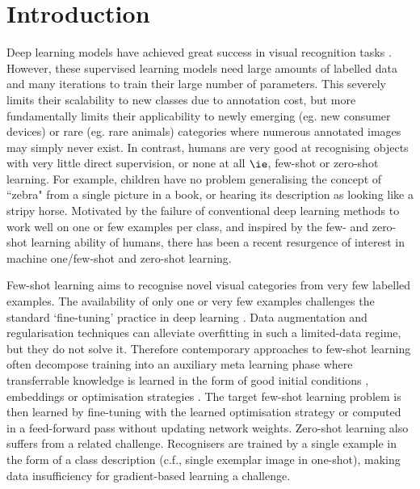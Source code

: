 \documentclass[10pt,twocolumn,letterpaper]{article}
\begin{document}
\section{Introduction}
Deep learning models have achieved great success in visual recognition tasks \cite{krizhevsky2012imagenet, he2016deep, simonyan2014very}. However, these supervised learning models need large amounts of labelled data and many iterations to train their large number of parameters. This severely limits their scalability to new classes due to annotation cost, but more fundamentally limits their applicability to newly emerging (eg. new consumer devices) or rare (eg. rare animals) categories where numerous annotated images may simply never exist. In contrast, humans are very good at recognising objects with very little direct supervision, or none at all $\ie$, few-shot  \cite{lake2011one, fei2006one} or zero-shot  \cite{lampert2014attribute} learning. For example, children have no problem generalising the concept of ``zebra" from a single picture in a book, or hearing its description as looking like a stripy horse. Motivated by the failure of conventional deep learning methods to work well on one or few examples per class, and inspired by the few- and zero-shot learning ability of humans, there has been a recent resurgence of interest in machine one/few-shot \cite{edwards2016towards, vinyals2016matching, santoro2016meta, kaiser2017learning, koch2015siamese, finn2017model, munkhdalai2017meta, snell2017prototypical, ravi2016optimization} and zero-shot \cite{frome2013devise,akata2015evaluation,lampert2014attribute,zhang2017learning,lei2015predicting,romera2015embarrassingly} learning.

Few-shot learning aims to recognise novel visual categories from very few labelled examples. The availability of only one or very few examples challenges the standard `fine-tuning' practice in deep learning \cite{finn2017model}. Data augmentation and regularisation techniques can alleviate overfitting in such a limited-data regime, but they do not solve it. Therefore contemporary approaches to few-shot learning often decompose training into an auxiliary meta learning phase where transferrable knowledge is learned in the form of good initial conditions \cite{finn2017model}, embeddings \cite{snell2017prototypical,vinyals2016matching} or optimisation strategies \cite{ravi2016optimization}. The target few-shot learning problem is then learned by fine-tuning \cite{finn2017model} with the learned optimisation strategy \cite{ravi2016optimization} or computed in a feed-forward pass \cite{snell2017prototypical,vinyals2016matching,bertinetto2016feedForwardOneShot,santoro2016meta} without updating network weights. Zero-shot learning also suffers from a related challenge. Recognisers are trained by a single example in the form of a class description (c.f., single exemplar image in one-shot), making data insufficiency for gradient-based learning a challenge.
\end{document}
